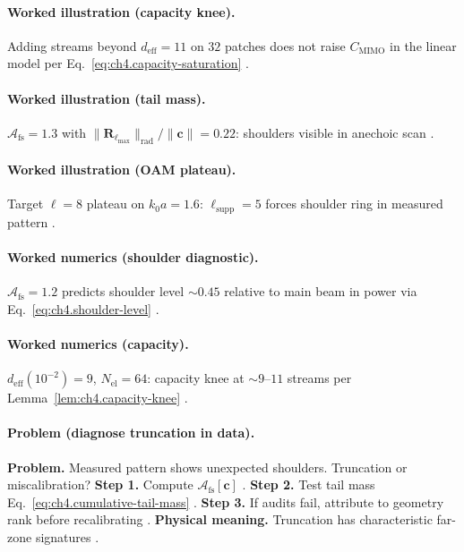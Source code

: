 \paragraph{Worked illustration (capacity knee).}
Adding streams beyond \(d_{\mathrm{eff}}=11\) on \(32\) patches does not raise \(C_{\mathrm{MIMO}}\) in the linear model per
Eq.~\eqref{eq:ch4.capacity-saturation} \cite{harrington2001,jackson1999,collin2001}.

\paragraph{Worked illustration (tail mass).}
\(\mathcal{A}_{\mathrm{fs}}=1.3\) with \(\|\mathbf{R}_{\ell_{\max}}\|_{\mathrm{rad}}/\|\mathbf{c}\|=0.22\): shoulders visible in anechoic scan
\cite{hansen1988,stratton1941,harrington2001}.

\paragraph{Worked illustration (OAM plateau).}
Target \(\ell=8\) plateau on \(k_{0}a=1.6\): \(\ell_{\mathrm{supp}}=5\) forces shoulder ring in measured pattern \cite{hansen1988,jackson1999,devaney2004}.

\paragraph{Worked numerics (shoulder diagnostic).}
\(\mathcal{A}_{\mathrm{fs}}=1.2\) predicts shoulder level \(\sim0.45\) relative to main beam in power via Eq.~\eqref{eq:ch4.shoulder-level}
\cite{hansen1988,harrington2001,stratton1941,devaney2004}.

\paragraph{Worked numerics (capacity).}
\(d_{\mathrm{eff}}(10^{-2})=9\), \(N_{\mathrm{el}}=64\): capacity knee at \(\sim9\)--\(11\) streams per Lemma~\ref{lem:ch4.capacity-knee}
\cite{harrington2001,devaney2004,collin2001,jackson1999}.

\paragraph{Problem (diagnose truncation in data).}
\textbf{Problem.} Measured pattern shows unexpected shoulders. Truncation or miscalibration?
\textbf{Step 1.} Compute \(\mathcal{A}_{\mathrm{fs}}[\mathbf{c}]\) \cite{hansen1988,stratton1941}.
\textbf{Step 2.} Test tail mass Eq.~\eqref{eq:ch4.cumulative-tail-mass} \cite{harrington2001,devaney2004}.
\textbf{Step 3.} If audits fail, attribute to geometry rank before recalibrating \cite{jackson1999}.
\textbf{Physical meaning.} Truncation has characteristic far-zone signatures \cite{hansen1988,stratton1941}.

